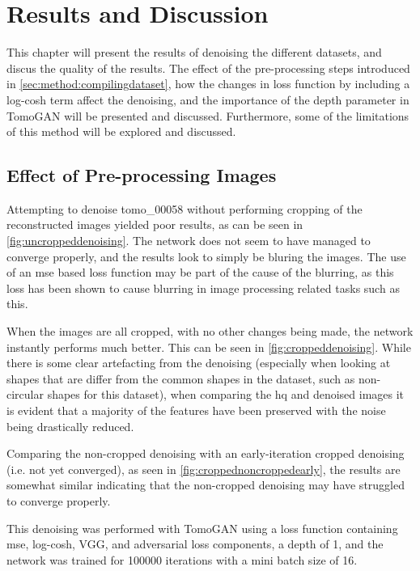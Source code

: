 \chapter{Results and Discussion}
\label{sec:results}
This chapter will present the results of denoising the different datasets, and discus the quality of the results. The effect of the pre-processing steps introduced in \cref{sec:method:compilingdataset}, how the changes in loss function by including a log-cosh term affect the denoising, and the importance of the depth parameter in TomoGAN will be presented and discussed. Furthermore, some of the limitations of this method will be explored and discussed. 

\section{Effect of Pre-processing Images}
Attempting to denoise tomo\_00058 without performing cropping of the reconstructed images yielded poor results, as can be seen in \cref{fig:uncroppeddenoising}. The network does not seem to have managed to converge properly, and the results look to simply be bluring the images. The use of an \acrshort{mse} based loss function may be part of the cause of the blurring, as this loss has been shown to cause blurring in image processing related tasks such as this. 

When the images are all cropped, with no other changes being made, the network instantly performs much better. This can be seen in \cref{fig:croppeddenoising}. While there is some clear artefacting from the denoising (especially when looking at shapes that are differ from the common shapes in the dataset, such as non-circular shapes for this dataset), when comparing the \acrshort{hq} and denoised images it is evident that a majority of the features have been preserved with the noise being drastically reduced. 

Comparing the non-cropped denoising with an early-iteration cropped denoising (i.e. not yet converged), as seen in \cref{fig:croppednoncroppedearly}, the results are somewhat similar indicating that the non-cropped denoising may have struggled to converge properly. 

This denoising was performed with TomoGAN using a loss function containing \acrshort{mse}, log-cosh, VGG, and adversarial loss components, a depth of 1, and the network was trained for 100000 iterations with a mini batch size of 16. 

